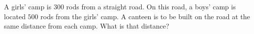 A girls' camp is \(300\) rods from a straight road. On this road, a boys' camp is located \(500\) rods from the girls' camp. A canteen is to be built on the road at the same distance from each camp. What is that distance?
